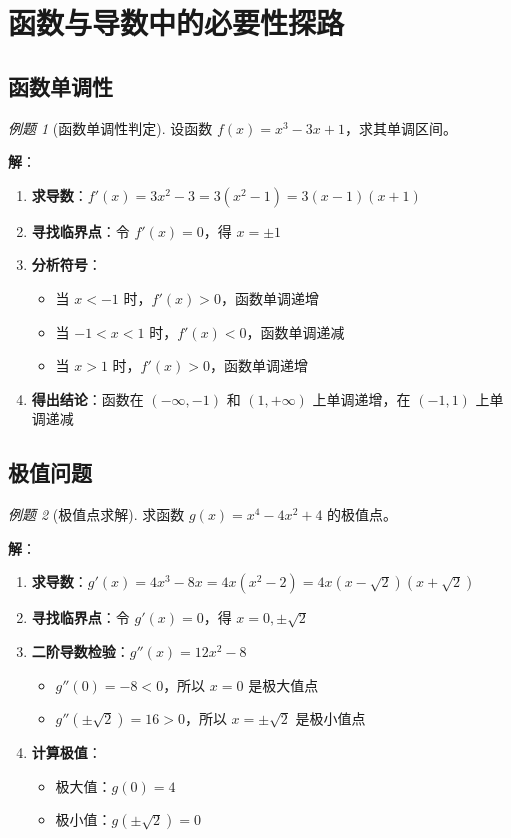 \documentclass[a4paper,11pt]{ctexart}
\newcommand{\keypoint}[1]{\textcolor{secondary}{\textbf{#1}}}
\theoremstyle{definition}
\theoremstyle{remark}
\newtheorem{example}{例题}[section]
\begin{document}
\newpage

\section{函数与导数中的必要性探路}

\subsection{函数单调性}

\begin{example}[函数单调性判定]
设函数 $f(x) = x^3 - 3x + 1$，求其单调区间。

\textbf{解}：
\begin{enumerate}
    \item \keypoint{求导数}：$f'(x) = 3x^2 - 3 = 3(x^2 - 1) = 3(x - 1)(x + 1)$
    \item \keypoint{寻找临界点}：令 $f'(x) = 0$，得 $x = \pm 1$
    \item \keypoint{分析符号}：
    \begin{itemize}
        \item 当 $x < -1$ 时，$f'(x) > 0$，函数单调递增
        \item 当 $-1 < x < 1$ 时，$f'(x) < 0$，函数单调递减
        \item 当 $x > 1$ 时，$f'(x) > 0$，函数单调递增
    \end{itemize}
    \item \keypoint{得出结论}：函数在 $(-\infty, -1)$ 和 $(1, +\infty)$ 上单调递增，在 $(-1, 1)$ 上单调递减
\end{enumerate}
\end{example}

\subsection{极值问题}

\begin{example}[极值点求解]
求函数 $g(x) = x^4 - 4x^2 + 4$ 的极值点。

\textbf{解}：
\begin{enumerate}
    \item \keypoint{求导数}：$g'(x) = 4x^3 - 8x = 4x(x^2 - 2) = 4x(x - \sqrt{2})(x + \sqrt{2})$
    \item \keypoint{寻找临界点}：令 $g'(x) = 0$，得 $x = 0, \pm\sqrt{2}$
    \item \keypoint{二阶导数检验}：$g''(x) = 12x^2 - 8$
    \begin{itemize}
        \item $g''(0) = -8 < 0$，所以 $x = 0$ 是极大值点
        \item $g''(\pm\sqrt{2}) = 16 > 0$，所以 $x = \pm\sqrt{2}$ 是极小值点
    \end{itemize}
    \item \keypoint{计算极值}：
    \begin{itemize}
        \item 极大值：$g(0) = 4$
        \item 极小值：$g(\pm\sqrt{2}) = 0$
    \end{itemize}
\end{enumerate}
\end{example}
\end{document}

